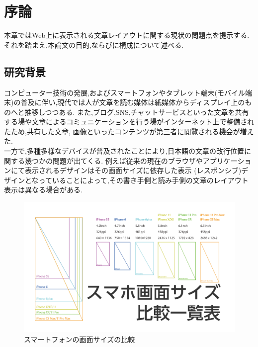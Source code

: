 
\chapter{序論}
\label{chap:introduction}

本章ではWeb上に表示される文章レイアウトに関する現状の問題点を提示する.
それを踏まえ,本論⽂の目的,ならびに構成について述べる.

\newpage




\section{研究背景}

コンピューター技術の発展,およびスマートフォンやタブレット端末(モバイル端末)の普及に伴い,現代では人が文章を読む媒体は紙媒体からディスプレイ上のものへと推移しつつある.
また,ブログ,SNS,チャットサービスといった文章を共有する場や文章によるコミュニケーションを行う場がインターネット上で整備されたため,共有した文章, 
画像といったコンテンツが第三者に閲覧される機会が増えた.
\\一方で,多種多様なデバイスが普及されたことにより,日本語の文章の改行位置に関する幾つかの問題が出てくる.
例えば従来の現在のブラウザやアプリケーションにて表示されるデザインはその画面サイズに依存した表示
(レスポンシブ)デザインとなっていることによって,その書き手側と読み手側の文章のレイアウト表示は異なる場合がある.


\begin{figure}[H]
    \centering
    \label{fig:image1}
    \includegraphics[width=0.7\columnwidth]{image/01/img1.png}
    \caption[スマートフォンの画面サイズの比較] {スマートフォンの画面サイズの比較\footnotemark[1]}
\end{figure}


